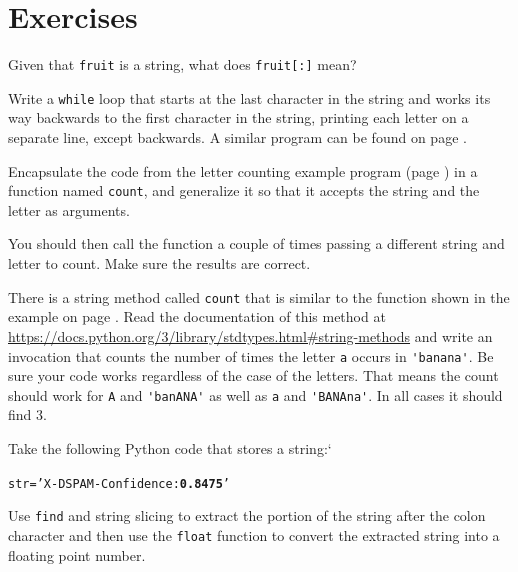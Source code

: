 \section{Exercises}

\begin{ex}
	Given that {\tt fruit} is a string, what does
	{\tt fruit[:]} mean?
\end{ex}

\begin{ex}
	Write a {\tt while} loop that starts at the last character in the string
	and works its way backwards to the first character in the string, 
	printing each letter on a separate line, except backwards. A similar program can be found on page \pageref{ch6StringTraversal}.
\end{ex}

\begin{ex}
	
	Encapsulate the code from the letter counting example program (page \pageref{ch6LetterCount}) in a function named {\tt count}, and generalize it so that it accepts the string and the
	letter as arguments.
	
	You should then call the function a couple of times passing a different string and letter to count. Make sure the results are correct.
\end{ex}

\begin{ex}
	
	There is a string method called {\tt count} that is similar
	to the function shown in the example on page \pageref{ch6StartsWithExample}.  Read the documentation
	of this method at
	\url{https://docs.python.org/3/library/stdtypes.html#string-methods}
	and write an invocation that counts the number of times the 
	letter {\tt a} occurs
	in \verb"'banana'". Be sure your code works regardless of the case of the letters. That means the count should work for {\tt A} and \verb"'banANA'" as well as {\tt a} and \verb"'BANAna'". In all cases it should find 3.
\end{ex}

\begin{ex}
Take the following Python code that stores a string:`

\beforeverb
\begin{alltt}
str = 'X-DSPAM-Confidence: {\bf 0.8475}'
\end{alltt}
\afterverb

Use {\tt find} and string slicing to extract the portion
of the string after the colon character and then use the 
{\tt float} function to convert the extracted string 
into a floating point number.

\end{ex}


